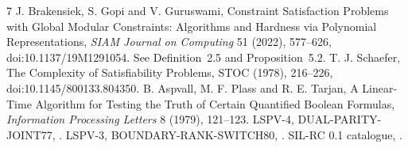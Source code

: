 \documentclass[11pt]{article}
\begin{document}
\begin{thebibliography}{7}
 J. Brakensiek, S. Gopi and V. Guruswami,
Constraint Satisfaction Problems with Global Modular Constraints:
Algorithms and Hardness via Polynomial Representations,
\emph{SIAM Journal on Computing} 51 (2022), 577--626,
doi:10.1137/19M1291054.  See Definition~2.5 and Proposition~5.2.
 T. J. Schaefer, The Complexity of Satisfiability Problems,
STOC (1978), 216--226, doi:10.1145/800133.804350.
 B. Aspvall, M. F. Plass and R. E. Tarjan,
A Linear-Time Algorithm for Testing the Truth of Certain Quantified Boolean
Formulas, \emph{Information Processing Letters} 8 (1979), 121--123.
 LSPV-4, DUAL-PARITY-JOINT77,
.
 LSPV-3, BOUNDARY-RANK-SWITCH80,
.
 SIL-RC 0.1 catalogue,
.
\end{thebibliography}
\end{document}
